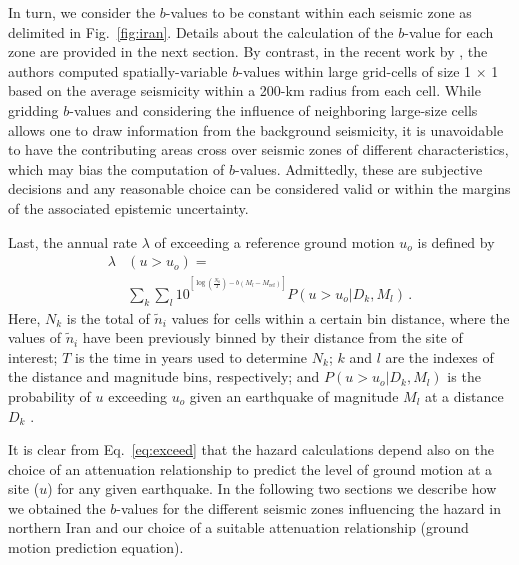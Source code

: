 In turn, we consider the $b$-values to be constant within each seismic zone as delimited in Fig.~\ref{fig:iran}. Details about the calculation of the $b$-value for each zone are provided in the next section. By contrast, in the recent work by \citet{Khodaverdian_2016_BSSA}, the authors computed spatially-variable $b$-values within large grid-cells of size 1\textdegree{} $\times$ 1\textdegree{} based on the average seismicity within a 200-km radius from each cell. While gridding $b$-values and considering the influence of neighboring large-size cells allows one to draw information from the background seismicity, it is unavoidable to have the contributing areas cross over seismic zones of different characteristics, which may bias the computation of $b$-values. Admittedly, these are subjective decisions and any reasonable choice can be considered valid or within the margins of the associated epistemic uncertainty.

Last, the annual rate $\lambda$ of exceeding a reference ground motion $u_o$ is defined by
%
\begin{align}
	\lambda & \left( u > u_o \right) = \nonumber \\
		& \sum_{k} \sum_{l} 10^{ {}^{ \left[ \log \left( \frac{ N_{k} }{ T } \right) - b \left( M_l - M_{\mathrm{ref}} \right) \right] } }
		P \left( u > u_o | D_k , M_l \right)
		\, .
	\label{eq:exceed}
\end{align}
%
Here, $N_k$ is the total of $\tilde{n}_i$ values for cells within a certain bin distance, where the values of $\tilde{n}_i$ have been previously binned by their distance from the site of interest; $T$ is the time in years used to determine $N_k$; $k$ and $l$ are the indexes of the distance and magnitude bins, respectively; and $P ( u > u_o | D_k , M_l )$ is the probability of $u$ exceeding $u_o$ given an earthquake of magnitude $M_l$ at a distance $D_k$ \citep{Frankel1995}.

It is clear from Eq.~\ref{eq:exceed} that the hazard calculations depend also on the choice of an attenuation relationship to predict the level of ground motion at a site ($u$) for any given earthquake. In the following two sections we describe how we obtained the $b$-values for the different seismic zones influencing the hazard in northern Iran and our choice of a suitable attenuation relationship (ground motion prediction equation).
